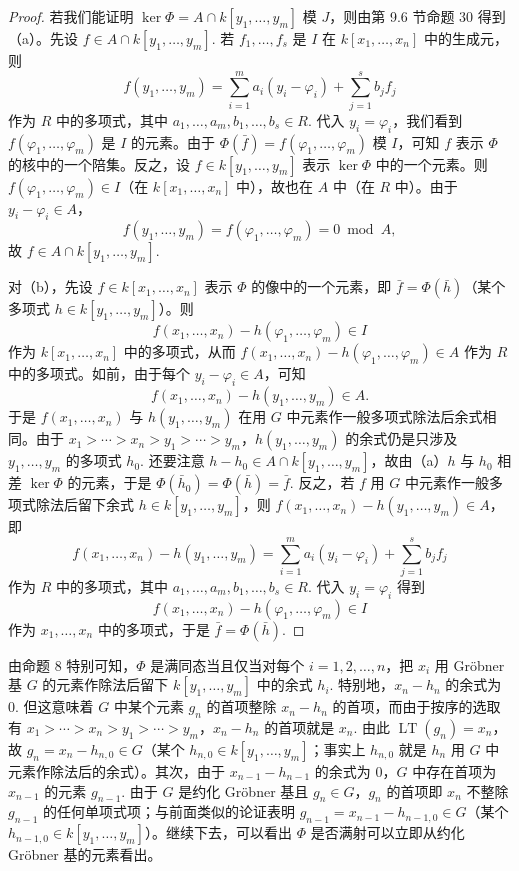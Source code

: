 \begin{proof}
若我们能证明 \(\ker\Phi = A \cap k[y_1, \ldots, y_m]\) 模 \(J\)，则由第 9.6 节命题 30 得到（a）。先设 \(f \in A \cap k[y_1, \ldots, y_m]\). 若 \(f_1, \ldots, f_s\) 是 \(I\) 在 \(k[x_1, \ldots, x_n]\) 中的生成元，则
\[
f(y_1, \ldots, y_m) = \sum_{i=1}^{m}a_i(y_i-\varphi_i)+\sum_{j=1}^{s}b_jf_j
\]
作为 \(R\) 中的多项式，其中 \(a_1, \ldots, a_m, b_1, \ldots, b_s \in R\). 代入 \(y_i = \varphi_i\)，我们看到 \(f(\varphi_1, \ldots, \varphi_m)\) 是 \(I\) 的元素。由于 \(\Phi(\bar f) = f(\varphi_1, \ldots, \varphi_m)\) 模 \(I\)，可知 \(f\) 表示 \(\Phi\) 的核中的一个陪集。反之，设 \(f \in k[y_1, \ldots, y_m]\) 表示 \(\ker\Phi\) 中的一个元素。则 \(f(\varphi_1, \ldots, \varphi_m) \in I\)（在 \(k[x_1, \ldots, x_n]\) 中），故也在 \(A\) 中（在 \(R\) 中）。由于 \(y_i-\varphi_i \in A\)，
\[
f(y_1, \ldots, y_m) = f(\varphi_1, \ldots, \varphi_m) = 0 \bmod A,
\]
故 \(f \in A \cap k[y_1, \ldots, y_m]\).

对（b），先设 \(f \in k[x_1, \ldots, x_n]\) 表示 \(\Phi\) 的像中的一个元素，即 \(\bar f = \Phi(\bar h)\)（某个多项式 \(h \in k[y_1, \ldots, y_m]\)）。则
\[
f(x_1, \ldots, x_n)-h(\varphi_1, \ldots, \varphi_m) \in I
\]
作为 \(k[x_1, \ldots, x_n]\) 中的多项式，从而 \(f(x_1, \ldots, x_n)-h(\varphi_1, \ldots, \varphi_m) \in A\) 作为 \(R\) 中的多项式。如前，由于每个 \(y_i-\varphi_i \in A\)，可知
\[
f(x_1, \ldots, x_n)-h(y_1, \ldots, y_m) \in A.
\]
于是 \(f(x_1, \ldots, x_n)\) 与 \(h(y_1, \ldots, y_m)\) 在用 \(G\) 中元素作一般多项式除法后余式相同。由于 \(x_1 > \cdots > x_n > y_1 > \cdots > y_m\)，\(h(y_1, \ldots, y_m)\) 的余式仍是只涉及 \(y_1, \ldots, y_m\) 的多项式 \(h_0\). 还要注意 \(h-h_0 \in A \cap k[y_1, \ldots, y_m]\)，故由（a）\(h\) 与 \(h_0\) 相差 \(\ker\Phi\) 的元素，于是 \(\Phi(\bar h_0) = \Phi(\bar h) = \bar f\). 反之，若 \(f\) 用 \(G\) 中元素作一般多项式除法后留下余式 \(h \in k[y_1, \ldots, y_m]\)，则 \(f(x_1, \ldots, x_n)-h(y_1, \ldots, y_m) \in A\)，即
\[
f(x_1, \ldots, x_n)-h(y_1, \ldots, y_m) = \sum_{i=1}^{m}a_i(y_i-\varphi_i)+\sum_{j=1}^{s}b_jf_j
\]
作为 \(R\) 中的多项式，其中 \(a_1, \ldots, a_m, b_1, \ldots, b_s \in R\). 代入 \(y_i = \varphi_i\) 得到
\[
f(x_1, \ldots, x_n)-h(\varphi_1, \ldots, \varphi_m) \in I
\]
作为 \(x_1, \ldots, x_n\) 中的多项式，于是 \(\bar f = \Phi(\bar h)\).
\end{proof}

由命题 8 特别可知，\(\Phi\) 是满同态当且仅当对每个 \(i = 1, 2, \ldots, n\)，把 \(x_i\) 用 Gröbner 基 \(G\) 的元素作除法后留下 \(k[y_1, \ldots, y_m]\) 中的余式 \(h_i\). 特别地，\(x_n-h_n\) 的余式为 0. 但这意味着 \(G\) 中某个元素 \(g_n\) 的首项整除 \(x_n-h_n\) 的首项，而由于按序的选取有 \(x_1 > \cdots > x_n > y_1 > \cdots > y_m\)，\(x_n-h_n\) 的首项就是 \(x_n\). 由此 \(\operatorname{LT}(g_n) = x_n\)，故 \(g_n = x_n-h_{n,0} \in G\)（某个 \(h_{n,0} \in k[y_1, \ldots, y_m]\)；事实上 \(h_{n,0}\) 就是 \(h_n\) 用 \(G\) 中元素作除法后的余式）。其次，由于 \(x_{n-1}-h_{n-1}\) 的余式为 0，\(G\) 中存在首项为 \(x_{n-1}\) 的元素 \(g_{n-1}\). 由于 \(G\) 是约化 Gröbner 基且 \(g_n \in G\)，\(g_n\) 的首项即 \(x_n\) 不整除 \(g_{n-1}\) 的任何单项式项；与前面类似的论证表明 \(g_{n-1} = x_{n-1}-h_{n-1,0} \in G\)（某个 \(h_{n-1,0} \in k[y_1, \ldots, y_m]\)）。继续下去，可以看出 \(\Phi\) 是否满射可以立即从约化 Gröbner 基的元素看出。

